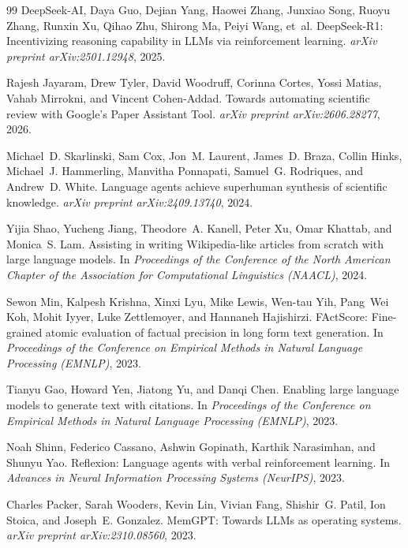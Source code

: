 \documentclass[11pt,a4paper]{article}
\begin{document}
\begin{thebibliography}{99}
DeepSeek-AI, Daya Guo, Dejian Yang, Haowei Zhang, Junxiao Song, Ruoyu Zhang, Runxin Xu, Qihao Zhu, Shirong Ma, Peiyi Wang, et~al.
\newblock DeepSeek-R1: Incentivizing reasoning capability in LLMs via reinforcement learning.
\newblock \emph{arXiv preprint arXiv:2501.12948}, 2025.

Rajesh Jayaram, Drew Tyler, David Woodruff, Corinna Cortes, Yossi Matias, Vahab Mirrokni, and Vincent Cohen-Addad.
\newblock Towards automating scientific review with Google's Paper Assistant Tool.
\newblock \emph{arXiv preprint arXiv:2606.28277}, 2026.

Michael~D. Skarlinski, Sam Cox, Jon~M. Laurent, James~D. Braza, Collin Hinks, Michael~J. Hammerling, Manvitha Ponnapati, Samuel~G. Rodriques, and Andrew~D. White.
\newblock Language agents achieve superhuman synthesis of scientific knowledge.
\newblock \emph{arXiv preprint arXiv:2409.13740}, 2024.

Yijia Shao, Yucheng Jiang, Theodore~A. Kanell, Peter Xu, Omar Khattab, and Monica~S. Lam.
\newblock Assisting in writing Wikipedia-like articles from scratch with large language models.
\newblock In \emph{Proceedings of the Conference of the North American Chapter of the Association for Computational Linguistics (NAACL)}, 2024.

Sewon Min, Kalpesh Krishna, Xinxi Lyu, Mike Lewis, Wen-tau Yih, Pang~Wei Koh, Mohit Iyyer, Luke Zettlemoyer, and Hannaneh Hajishirzi.
\newblock FActScore: Fine-grained atomic evaluation of factual precision in long form text generation.
\newblock In \emph{Proceedings of the Conference on Empirical Methods in Natural Language Processing (EMNLP)}, 2023.

Tianyu Gao, Howard Yen, Jiatong Yu, and Danqi Chen.
\newblock Enabling large language models to generate text with citations.
\newblock In \emph{Proceedings of the Conference on Empirical Methods in Natural Language Processing (EMNLP)}, 2023.

Noah Shinn, Federico Cassano, Ashwin Gopinath, Karthik Narasimhan, and Shunyu Yao.
\newblock Reflexion: Language agents with verbal reinforcement learning.
\newblock In \emph{Advances in Neural Information Processing Systems (NeurIPS)}, 2023.

Charles Packer, Sarah Wooders, Kevin Lin, Vivian Fang, Shishir~G. Patil, Ion Stoica, and Joseph~E. Gonzalez.
\newblock MemGPT: Towards LLMs as operating systems.
\newblock \emph{arXiv preprint arXiv:2310.08560}, 2023.


\end{thebibliography}
\end{document}
